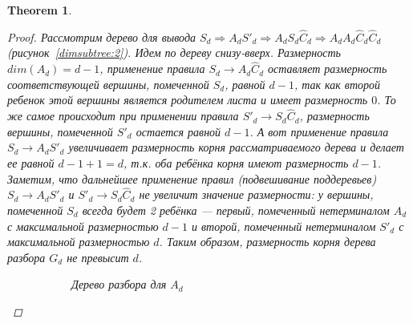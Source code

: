 \documentclass[11pt,a4paper]{article} %
\newtheorem{theorem}{Theorem}
\begin{document}
\begin{theorem}
\begin{proof}
Рассмотрим дерево для вывода 
$S_d  \Rightarrow A_d S'_d \Rightarrow A_d S_d \widehat{C}_d \Rightarrow A_d A_d \widehat{C}_d \widehat{C}_d$ (рисунок~\ref{dimsubtree:2}). Идем по дереву снизу-вверх. Размерность $dim(A_d) = d - 1$, применение правила $S_d \rightarrow  A_d\widehat{C}_d$ оставляет размерность соответствующей вершины, помеченной $S_d$, равной $d-1$, так как второй ребенок этой вершины является родителем листа и имеет размерность $0$. То же самое происходит при применении правила $S'_d \rightarrow S_d\widehat{C}_d$, размерность вершины, помеченной $S'_d$ остается равной $d-1$. А вот применение правила $S_d \rightarrow A_dS'_d$ увеличивает размерность корня рассматриваемого дерева и делает ее равной $d-1+1 = d$, т.к. оба ребёнка корня имеют размерность $d-1$. Заметим, что дальнейшее применение правил (подвешивание поддеревьев) $S_d \rightarrow A_dS'_d$ и $S'_d \rightarrow S_d\widehat{C}_d$ не увеличит значение размерности: у вершины, помеченной $S_d$ всегда будет 2 ребёнка --- первый, помеченный нетерминалом $A_d$ с максимальной размерностью $d-1$ и второй, помеченный нетерминалом $S'_d$ с максимальной размерностью $d$. Таким образом, размерность корня дерева разбора $G_d$ не превысит $d$.

\begin{figure}
\centering
\begin{subfigure}{.5\textwidth}
  \centering
{}
  \caption{Дерево разбора для $A_d$}
  \label{dimsubtree:1}
\end{subfigure}%
\begin{subfigure}{.5\textwidth}
  \centering
\begin{tikzpicture}[
level 1/.style={sibling distance=3cm},
level 2/.style={sibling distance=1.5cm}]


\end{tikzpicture}
\end{subfigure}
\end{figure}
\end{proof}
\end{theorem}
\end{document}
